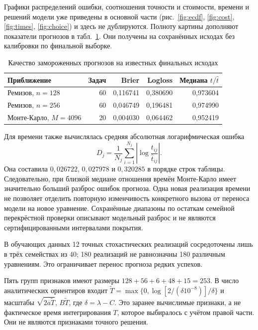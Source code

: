 Графики распределений ошибки, соотношения точности и стоимости, времени и решений модели уже приведены в основной части (рис.~\ref{fig:ecdf}, \ref{fig:cost}, \ref{fig:times}, \ref{fig:choice}) и здесь не дублируются. Полноту картины дополняют показатели прогнозов в табл.~\ref{tab:forecasts}. Они получены на сохранённых исходах без калибровки по финальной выборке.
\begin{table}[!ht]\centering\caption{Качество замороженных прогнозов на известных финальных исходах}\label{tab:forecasts}
\small\begin{tabular}{lrrrr}\toprule Приближение&Задач&Brier&Logloss&Медиана $t/\widehat t$\\\midrule
Ремизов, $n=128$&60&0,116741&0,380690&0,973604\\
Ремизов, $n=256$&60&0,046749&0,196481&0,974990\\
Монте-Карло, $M=4096$&20&0,004030&0,064462&0,952419\\\bottomrule\end{tabular}\end{table}
Для времени также вычислялась средняя абсолютная логарифмическая ошибка
\begin{equation}
D_j=\frac1{N_j}\sum_{i=1}^{N_j}\left|\log\frac{t_{ij}}{\widehat t_{ij}}\right|.
\end{equation}
Она составила $0{,}026722$, $0{,}027978$ и $0{,}320285$ в порядке строк таблицы. Следовательно, при близкой медиане отношения времён Монте-Карло имеет значительно больший разброс ошибок прогноза. Одна новая реализация времени не позволяет отделить повторную изменчивость конкретного вызова от переноса модели на новое уравнение. Сохранённые диапазоны по остаткам семейной перекрёстной проверки описывают модельный разброс и не являются сертифицированными интервалами покрытия.

В обучающих данных 12 точных стохастических реализаций сосредоточены лишь в трёх семействах из 40; 180 реализаций не равнозначны 180 различным уравнениям. Это ограничивает перенос прогноза редких успехов.

Пять групп признаков имеют размеры $128+56+6+48+15=253$. В число аналитических ориентиров входит $\widetilde T=\max\{0,\log[2/(\delta10^{-8})]/\delta\}$ и масштабы $\sqrt{2\overline a\widetilde T}$, $B\widetilde T$, где $\delta=\lambda-C$. Это заранее вычислимые признаки, а не фактическое время интегрирования $T$, которое выбиралось с учётом правой части. Они не являются признаками точного решения.

